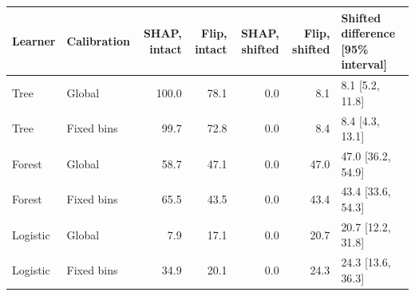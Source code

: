 \begin{tabular}{llrrrrl}
\toprule
Learner & Calibration & SHAP, intact & Flip, intact & SHAP, shifted & Flip, shifted & Shifted difference [95\% interval] \\
\midrule
Tree & Global & 100.0 & 78.1 & 0.0 & 8.1 & 8.1 [5.2, 11.8] \\
Tree & Fixed bins & 99.7 & 72.8 & 0.0 & 8.4 & 8.4 [4.3, 13.1] \\
Forest & Global & 58.7 & 47.1 & 0.0 & 47.0 & 47.0 [36.2, 54.9] \\
Forest & Fixed bins & 65.5 & 43.5 & 0.0 & 43.4 & 43.4 [33.6, 54.3] \\
Logistic & Global & 7.9 & 17.1 & 0.0 & 20.7 & 20.7 [12.2, 31.8] \\
Logistic & Fixed bins & 34.9 & 20.1 & 0.0 & 24.3 & 24.3 [13.6, 36.3] \\
\bottomrule
\end{tabular}

